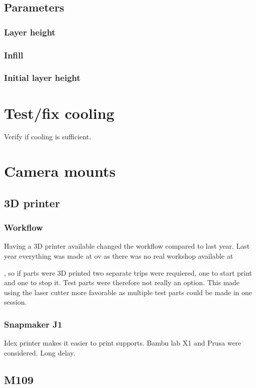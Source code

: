 \subsection{Parameters}
\subsubsection{Layer height}
\subsubsection{Infill}
\subsubsection{Initial layer height}




\section{Test/fix cooling}
Verify if cooling is sufficient.

\section{Camera mounts}

\subsection{3D printer}

\subsubsection{Workflow}
Having a 3D printer available changed the workflow compared to last year.
Last year everything was made at \gls{ov} as there was no real workshop available at

, so if parts were 3D printed two separate trips were requiered, one to start print and one to stop it.
Test parts were therefore not really an option.
This made using the laser cutter more favorable as multiple test parts could be made in one session.

\subsubsection{Snapmaker J1}
Idex printer makes it easier to print supports.
Bambu lab X1 and Prusa were considered.
Long delay.

\subsection{M109}


